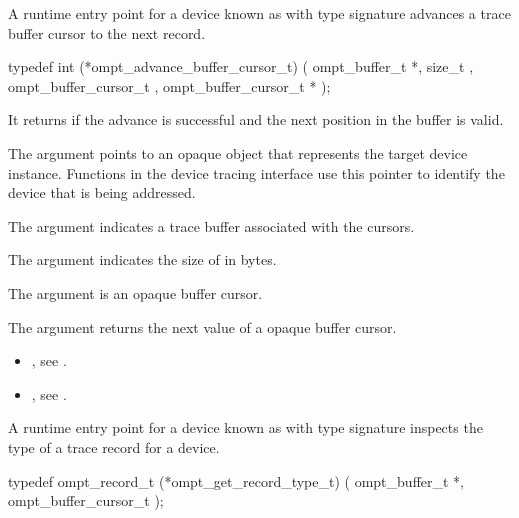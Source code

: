 \label{sec:ompt_advance_buffer_cursor_t}


\summary
A runtime entry point for a device known as 
with type signature 
advances a trace buffer cursor to the next record.

\format
\begin{ccppspecific}
\begin{omptInquiry}
typedef int (*ompt_advance_buffer_cursor_t) (
  ompt_buffer_t *,
  size_t ,
  ompt_buffer_cursor_t ,
  ompt_buffer_cursor_t *
);
\end{omptInquiry}
\end{ccppspecific}

\descr
It returns  if the advance is successful and the next
position in the buffer is valid.

\argdesc
The  argument points to an opaque object that represents
the target device instance. Functions in the device tracing interface
use this pointer to identify the device that is being addressed.

The argument  indicates a trace buffer associated
with the cursors.

The argument  indicates the size of  in
bytes.

The argument  is an opaque buffer cursor.

The argument  returns the next value of a opaque buffer cursor.


\crossreferences
\begin{itemize}
\item {},
see .
\item {},
see .
\end{itemize}

\label{sec:ompt_get_record_type_t}

\summary
A runtime entry point for a device known as
 with type signature
 inspects the type
of a trace record for a device.

\format
\begin{ccppspecific}
\begin{omptInquiry}
typedef ompt_record_t (*ompt_get_record_type_t) (
  ompt_buffer_t *,
  ompt_buffer_cursor_t 
);
\end{omptInquiry}
\end{ccppspecific}

